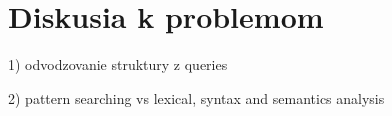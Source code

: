 \chapter{Diskusia k problemom}

1) odvodzovanie struktury z queries

2) pattern searching vs lexical, syntax and semantics analysis